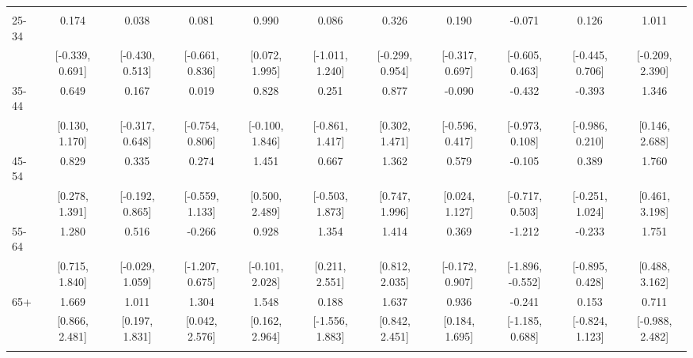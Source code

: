 \documentclass[
  10,
  letterpaper,
  DIV=11,
  numbers=noendperiod]{scrartcl}
\begin{document}
\begin{table}
\begin{tabular}[t]{lcccccccccc}
\addlinespace[0.3em]
\multicolumn{11}{l}{\cellcolor[HTML]{3498DB}{\textbf{Age}}}\\
\hspace{1em}25-34 & 0.174 & 0.038 & 0.081 & 0.990 & 0.086 & 0.326 & 0.190 & -0.071 & 0.126 & 1.011\\
\hspace{1em} & {}[-0.339, 0.691] & {}[-0.430, 0.513] & {}[-0.661, 0.836] & {}[0.072, 1.995] & {}[-1.011, 1.240] & {}[-0.299, 0.954] & {}[-0.317, 0.697] & {}[-0.605, 0.463] & {}[-0.445, 0.706] & {}[-0.209, 2.390]\\
\hspace{1em}35-44 & 0.649 & 0.167 & 0.019 & 0.828 & 0.251 & 0.877 & -0.090 & -0.432 & -0.393 & 1.346\\
\hspace{1em} & {}[0.130, 1.170] & {}[-0.317, 0.648] & {}[-0.754, 0.806] & {}[-0.100, 1.846] & {}[-0.861, 1.417] & {}[0.302, 1.471] & {}[-0.596, 0.417] & {}[-0.973, 0.108] & {}[-0.986, 0.210] & {}[0.146, 2.688]\\
\hspace{1em}45-54 & 0.829 & 0.335 & 0.274 & 1.451 & 0.667 & 1.362 & 0.579 & -0.105 & 0.389 & 1.760\\
\hspace{1em} & {}[0.278, 1.391] & {}[-0.192, 0.865] & {}[-0.559, 1.133] & {}[0.500, 2.489] & {}[-0.503, 1.873] & {}[0.747, 1.996] & {}[0.024, 1.127] & {}[-0.717, 0.503] & {}[-0.251, 1.024] & {}[0.461, 3.198]\\
\hspace{1em}55-64 & 1.280 & 0.516 & -0.266 & 0.928 & 1.354 & 1.414 & 0.369 & -1.212 & -0.233 & 1.751\\
\hspace{1em} & {}[0.715, 1.840] & {}[-0.029, 1.059] & {}[-1.207, 0.675] & {}[-0.101, 2.028] & {}[0.211, 2.551] & {}[0.812, 2.035] & {}[-0.172, 0.907] & {}[-1.896, -0.552] & {}[-0.895, 0.428] & {}[0.488, 3.162]\\
\hspace{1em}65+ & 1.669 & 1.011 & 1.304 & 1.548 & 0.188 & 1.637 & 0.936 & -0.241 & 0.153 & 0.711\\
\hspace{1em} & {}[0.866, 2.481] & {}[0.197, 1.831] & {}[0.042, 2.576] & {}[0.162, 2.964] & {}[-1.556, 1.883] & {}[0.842, 2.451] & {}[0.184, 1.695] & {}[-1.185, 0.688] & {}[-0.824, 1.123] & {}[-0.988, 2.482]\\
\addlinespace[0.3em]
\multicolumn{11}{l}{\cellcolor[HTML]{3498DB}{\textbf{Income}}}\\

\end{tabular}
\end{table}
\end{document}
